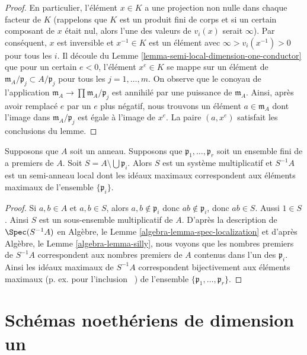 \begin{proof}
\medskip\noindent
En particulier, l'élément $x \in K$ a une projection non
nulle dans chaque facteur de $K$ (rappelons que $K$ est un
produit fini de corps et si un certain composant de $x$ était
nul, alors l'une des valeurs de $v_i(x)$ serait $\infty$).
Par conséquent, $x$ est inversible et $x^{-1} \in K$ est un
élément avec $\infty > v_i(x^{-1}) > 0$ pour tous les $i$. Il
découle du Lemme
\ref{lemma-semi-local-dimension-one-conductor} que pour un certain
$e < 0$, l'élément $x^e \in K$ se mappe sur un élément de
$\mathfrak m_A/\mathfrak p_j \subset A/\mathfrak p_j$ pour tous les
$j = 1, \ldots, m$. On observe que le conoyau de l'application
$\mathfrak m_A \to \prod \mathfrak m_A/\mathfrak p_j$ est annihilé
par une puissance de $\mathfrak m_A$. Ainsi, après avoir remplacé $e$
par un $e$ plus négatif, nous trouvons un élément $a \in \mathfrak
m_A$ dont l'image dans $\mathfrak m_A/\mathfrak p_j$ est égale à
l'image de $x^e$. La paire $(a, x^e)$ satisfait les conclusions du lemme.
\end{proof}

\begin{lemma}
\label{lemma-localization-semi-local}
Supposons que $A$ soit un anneau. Supposons que $\mathfrak p_1,
\ldots, \mathfrak p_r$ soit un ensemble fini de a premiers de $A$. Soit
$S = A \setminus \bigcup \mathfrak p_i$. Alors $S$ est un système
multiplicatif et $S^{-1}A$ est un semi-anneau local dont les idéaux
maximaux correspondent aux éléments maximaux de l'ensemble $\{\mathfrak p_i\}$.
\end{lemma}

\begin{proof}
Si $a, b \in A$ et $a, b \in S$, alors $a, b \not \in
\mathfrak p_i$ donc $ab \not \in \mathfrak p_i$, donc
$ab \in S$. Aussi $1 \in S$. Ainsi $S$ est un
sous-ensemble multiplicatif de $A$. D'après la
description de $\Spec(S^{-1}A)$ en Algèbre, le Lemme
\ref{algebra-lemma-spec-localization} et d'après Algèbre,
le Lemme \ref{algebra-lemma-silly}, nous voyons que les
nombres premiers de $S^{-1}A$ correspondent aux nombres
premiers de $A$ contenus dans l'un des $\mathfrak p_i$.
Ainsi les idéaux maximaux de $S^{-1}A$ correspondent
bijectivement aux éléments maximaux (p. ex. pour l'inclusion
\ ) de l'ensemble $\{\mathfrak p_1, \ldots, \mathfrak p_r\}$.
\end{proof}




\section{Schémas noethériens de dimension un}
\label{section-dimension-one}

